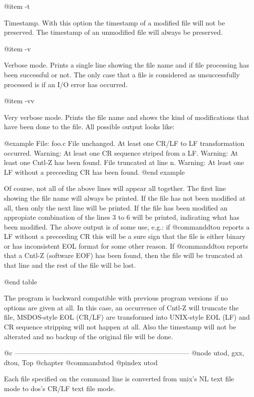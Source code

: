 @item -t

Timestamp.  With this option the timestamp of a modified file will not be
preserved.  The timestamp of an unmodified file will always be preserved.

@item -v

Verbose mode.  Prints a single line showing the file name and if file
processing has been successful or not.  The only case that a file is
considered as unsuccessfully processed is if an I/O error has occurred.

@item -vv

Very verbose mode.  Prints the file name and shows the kind of modifications
that have been done to the file.  All possible output looks like:

@example
File: foo.c
File unchanged.
At least one CR/LF to LF transformation occurred.
Warning: At least one CR sequence striped from a LF.
Warning: At least one Cntl-Z has been found. File truncated
         at line n.
Warning: At least one LF without a preceeding CR has been found.
@end example

Of course, not all of the above lines will appear all together.  The first
line showing the file name will always be printed.  If the file has not been
modified at all, then only the next line will be printed.  If the file has
been modified an appropiate combination of the lines 3 to 6 will be printed,
indicating what has been modified.  The above output is of some use, e.g.:
if @command{dtou} reports a LF without a preceeding CR this will be a sure sign
that the file is either binary or has inconsistent EOL format for some other
reason.  If @command{dtou} reports that a Cntl-Z (software EOF) has been found,
then the file will be truncated at that line and the rest of the file will be
lost.

@end table

The program is backward compatible with previous program versions if no options
are given at all.  In this case, an occurrence of Cntl-Z will truncate the file,
MSDOS-style EOL (CR/LF) are transformed into UNIX-style EOL (LF) and CR sequence
stripping will not happen at all.  Also the timestamp will not be alterated and
no backup of the original file will be done.

@c -----------------------------------------------------------------------------
@node utod, gxx, dtou, Top
@chapter @command{utod}
@pindex utod

Each file specified on the command line is converted from unix's NL text
file mode to dos's CR/LF text file mode.

